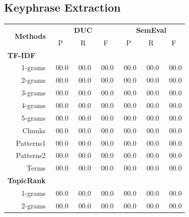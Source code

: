 
  \subsection{Keyphrase Extraction}
  \label{subsec:keyphrase_extraction}

    \begin{table}[h]
      \centering
      \begin{tabular}{@{~}r@{~~}c@{~~}c@{~~}c@{~~}c@{~~}c@{~~}c@{~}}
        \toprule
        \multirow{2}{*}[-2pt]{\textbf{Methods}} & \multicolumn{3}{c}{\textbf{DUC}} & \multicolumn{3}{c}{\textbf{SemEval}}\\
        \cmidrule(r){2-4}\cmidrule{5-7}
        & P & R & F & P & R & F\\
        \midrule
        \multicolumn{1}{l}{\textbf{TF-IDF}}\\
        1-grams & ${~~}$00.0 & ${~~}$00.0 & ${~~}$00.0 & ${~~}$00.0 & ${~~}$00.0 & ${~~}$00.0\\
        2-grams & ${~~}$00.0 & ${~~}$00.0 & ${~~}$00.0 & ${~~}$00.0 & ${~~}$00.0 & ${~~}$00.0\\
        3-grams & ${~~}$00.0 & ${~~}$00.0 & ${~~}$00.0 & ${~~}$00.0 & ${~~}$00.0 & ${~~}$00.0\\
        4-grams & ${~~}$00.0 & ${~~}$00.0 & ${~~}$00.0 & ${~~}$00.0 & ${~~}$00.0 & ${~~}$00.0\\
        5-grams & ${~~}$00.0 & ${~~}$00.0 & ${~~}$00.0 & ${~~}$00.0 & ${~~}$00.0 & ${~~}$00.0\\
        Chunks & ${~~}$00.0 & ${~~}$00.0 & ${~~}$00.0 & ${~~}$00.0 & ${~~}$00.0 & ${~~}$00.0\\
        Patterns1 & ${~~}$00.0 & ${~~}$00.0 & ${~~}$00.0 & ${~~}$00.0 & ${~~}$00.0 & ${~~}$00.0\\
        Patterns2 & ${~~}$00.0 & ${~~}$00.0 & ${~~}$00.0 & ${~~}$00.0 & ${~~}$00.0 & ${~~}$00.0\\
        Terms & ${~~}$00.0 & ${~~}$00.0 & ${~~}$00.0 & ${~~}$00.0 & ${~~}$00.0 & ${~~}$00.0\\
        \multicolumn{1}{l}{\textbf{TopicRank}}\\
        1-grams & ${~~}$00.0 & ${~~}$00.0 & ${~~}$00.0 & ${~~}$00.0 & ${~~}$00.0 & ${~~}$00.0\\
        2-grams & ${~~}$00.0 & ${~~}$00.0 & ${~~}$00.0 & ${~~}$00.0 & ${~~}$00.0 & ${~~}$00.0\\

\end{tabular}
\end{table}
